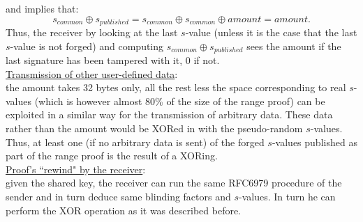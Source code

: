 and implies that: 
\begin{equation*}
    s_{common} \oplus s_{published} = s_{common} \oplus s_{common} \oplus amount = amount.
\end{equation*}
Thus, the receiver by looking at the last $s$-value (unless it is the case that the last $s$-value is not forged) and computing $s_{common} \oplus s_{published}$ sees the amount if the last signature has been tampered with it, 0 if not.\\
\underline{Transmission of other user-defined data}:\\
the amount takes 32 bytes only, all the rest less the space corresponding to real $s$-values (which is however almost 80\% of the size of the range proof) can be exploited in a similar way for the transmission of arbitrary data. These data rather than the amount would be XORed in with the pseudo-random $s$-values. \\
Thus, at least one (if no arbitrary data is sent) of the forged $s$-values published as part of the range proof is the result of a XORing.\\
\underline{Proof's ``rewind" by the receiver}:\\
given the shared key, the receiver can run the same RFC6979 procedure of the sender and in turn deduce same blinding factors and $s$-values. In turn he can perform the XOR operation as it was described before.